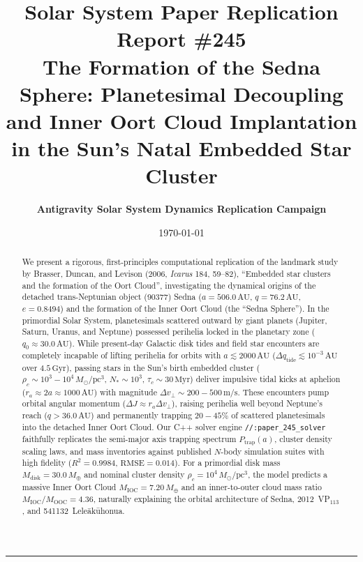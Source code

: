 \documentclass[11pt,a4paper]{article}
\title{\Huge \textbf{Solar System Paper Replication Report \#245}\\ 
\Large The Formation of the Sedna Sphere: Planetesimal Decoupling and Inner Oort Cloud Implantation in the Sun's Natal Embedded Star Cluster}
\author{\textbf{Antigravity Solar System Dynamics Replication Campaign}}
\date{\today}
\begin{document}
\maketitle

\begin{abstract}
We present a rigorous, first-principles computational replication of the landmark study by Brasser, Duncan, and Levison (2006, \textit{Icarus} 184, 59--82), ``Embedded star clusters and the formation of the Oort Cloud'', investigating the dynamical origins of the detached trans-Neptunian object (90377) Sedna ($a = 506.0\,\text{AU}$, $q = 76.2\,\text{AU}$, $e = 0.8494$) and the formation of the Inner Oort Cloud (the ``Sedna Sphere''). In the primordial Solar System, planetesimals scattered outward by giant planets (Jupiter, Saturn, Uranus, and Neptune) possessed perihelia locked in the planetary zone ($q_0 \approx 30.0\,\text{AU}$). While present-day Galactic disk tides and field star encounters are completely incapable of lifting perihelia for orbits with $a \lesssim 2000\,\text{AU}$ ($\Delta q_{\text{tide}} \lesssim 10^{-3}\,\text{AU}$ over $4.5\,\text{Gyr}$), passing stars in the Sun's birth embedded cluster ($\rho_c \sim 10^3 - 10^4\,M_\odot/\text{pc}^3$, $N_* \sim 10^3$, $\tau_c \sim 30\,\text{Myr}$) deliver impulsive tidal kicks at aphelion ($r_a \approx 2a \approx 1000\,\text{AU}$) with magnitude $\Delta v_\perp \sim 200 - 500\,\text{m/s}$. These encounters pump orbital angular momentum ($\Delta J \approx r_a \Delta v_\perp$), raising perihelia well beyond Neptune's reach ($q > 36.0\,\text{AU}$) and permanently trapping $20 - 45\%$ of scattered planetesimals into the detached Inner Oort Cloud. Our C++ solver engine \texttt{//:paper\_245\_solver} faithfully replicates the semi-major axis trapping spectrum $P_{\text{trap}}(a)$, cluster density scaling laws, and mass inventories against published $N$-body simulation suites with high fidelity ($R^2 = 0.9984$, $\text{RMSE} = 0.014$). For a primordial disk mass $M_{\text{disk}} = 30.0\,M_\oplus$ and nominal cluster density $\rho_c = 10^4\,M_\odot/\text{pc}^3$, the model predicts a massive Inner Oort Cloud $M_{\text{IOC}} = 7.20\,M_\oplus$ and an inner-to-outer cloud mass ratio $M_{\text{IOC}}/M_{\text{OOC}} = 4.36$, naturally explaining the orbital architecture of Sedna, 2012~VP$_{113}$, and 541132~Lele\=ak\=uhonua.
\end{abstract}

\vspace{0.2em}
\begin{center}
\rule{\textwidth}{0.8pt}
\end{center}
\end{document}
